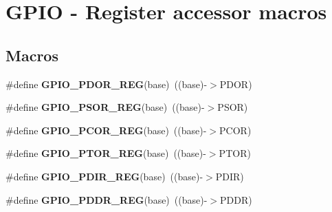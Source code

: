 \hypertarget{group__GPIO__Register__Accessor__Macros}{}\section{G\+P\+IO -\/ Register accessor macros}
\label{group__GPIO__Register__Accessor__Macros}
\subsection*{Macros}
\begin{DoxyCompactItemize}
\item 
\#define {\bfseries G\+P\+I\+O\+\_\+\+P\+D\+O\+R\+\_\+\+R\+EG}(base)~((base)-\/$>$P\+D\+OR)\hypertarget{group__GPIO__Register__Accessor__Macros_ga9a1866048e6b4643f38c8f1345b6ee60}{}\label{group__GPIO__Register__Accessor__Macros_ga9a1866048e6b4643f38c8f1345b6ee60}

\item 
\#define {\bfseries G\+P\+I\+O\+\_\+\+P\+S\+O\+R\+\_\+\+R\+EG}(base)~((base)-\/$>$P\+S\+OR)\hypertarget{group__GPIO__Register__Accessor__Macros_gab745be6958ca2e22e2b475a611f473ca}{}\label{group__GPIO__Register__Accessor__Macros_gab745be6958ca2e22e2b475a611f473ca}

\item 
\#define {\bfseries G\+P\+I\+O\+\_\+\+P\+C\+O\+R\+\_\+\+R\+EG}(base)~((base)-\/$>$P\+C\+OR)\hypertarget{group__GPIO__Register__Accessor__Macros_ga97e0b9004936c347bd4728e34a5bd5cf}{}\label{group__GPIO__Register__Accessor__Macros_ga97e0b9004936c347bd4728e34a5bd5cf}

\item 
\#define {\bfseries G\+P\+I\+O\+\_\+\+P\+T\+O\+R\+\_\+\+R\+EG}(base)~((base)-\/$>$P\+T\+OR)\hypertarget{group__GPIO__Register__Accessor__Macros_gac6579b41a85fbb464dacde9472ad7d83}{}\label{group__GPIO__Register__Accessor__Macros_gac6579b41a85fbb464dacde9472ad7d83}

\item 
\#define {\bfseries G\+P\+I\+O\+\_\+\+P\+D\+I\+R\+\_\+\+R\+EG}(base)~((base)-\/$>$P\+D\+IR)\hypertarget{group__GPIO__Register__Accessor__Macros_ga2c24da45995f7a27504c3789daae14ce}{}\label{group__GPIO__Register__Accessor__Macros_ga2c24da45995f7a27504c3789daae14ce}

\item 
\#define {\bfseries G\+P\+I\+O\+\_\+\+P\+D\+D\+R\+\_\+\+R\+EG}(base)~((base)-\/$>$P\+D\+DR)\hypertarget{group__GPIO__Register__Accessor__Macros_ga61dac233f8be25e95cd419eb79714a07}{}\label{group__GPIO__Register__Accessor__Macros_ga61dac233f8be25e95cd419eb79714a07}


\end{DoxyCompactItemize}
